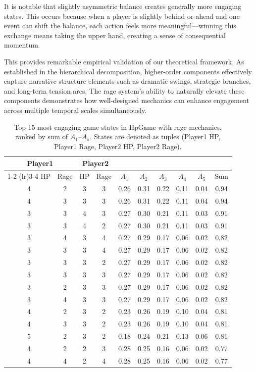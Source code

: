 \documentclass[manuscript,review,anonymous]{acmart}
\theoremstyle{definition}
\theoremstyle{plain}
\begin{document}
It is notable that slightly asymmetric balance creates generally more engaging states.
This occurs because when a player is slightly behind or ahead and one event can shift the balance, each action feels more meaningful---winning this exchange means taking the upper hand, creating a sense of consequential momentum.

This provides remarkable empirical validation of our theoretical framework.
As established in the hierarchical decomposition, higher-order components effectively capture narrative structure elements such as dramatic swings, strategic branches, and long-term tension arcs.
The rage system's ability to naturally elevate these components demonstrates how well-designed mechanics can enhance engagement across multiple temporal scales simultaneously.

\begin{table}
  \caption{Top 15 most engaging game states in HpGame with rage mechanics, ranked by sum of $A_1$--$A_5$. States are denoted as tuples (Player1 HP, Player1 Rage, Player2 HP, Player2 Rage).}
  \label{tab:most_engaging_states_rage}
  \setlength{\tabcolsep}{4pt}
  \begin{tabular}{cccccccccc}
    \toprule
    \multicolumn{2}{c}{Player1} & \multicolumn{2}{c}{Player2} & \multicolumn{6}{c}{} \\ 
    \cmidrule(lr){1-2} \cmidrule(lr){3-4}
    HP & Rage & HP & Rage & $A_1$ & $A_2$ & $A_3$ & $A_4$ & $A_5$ & Sum \\
    \midrule
    4 & 2 & 3 & 3 & 0.26 & 0.31 & 0.22 & 0.11 & 0.04 & 0.94 \\
    4 & 3 & 3 & 3 & 0.26 & 0.31 & 0.22 & 0.11 & 0.04 & 0.94 \\
    3 & 3 & 4 & 3 & 0.27 & 0.30 & 0.21 & 0.11 & 0.03 & 0.91 \\
    3 & 3 & 4 & 2 & 0.27 & 0.30 & 0.21 & 0.11 & 0.03 & 0.91 \\
    3 & 4 & 3 & 4 & 0.27 & 0.29 & 0.17 & 0.06 & 0.02 & 0.82 \\
    3 & 3 & 3 & 4 & 0.27 & 0.29 & 0.17 & 0.06 & 0.02 & 0.82 \\
    3 & 3 & 3 & 2 & 0.27 & 0.29 & 0.17 & 0.06 & 0.02 & 0.82 \\
    3 & 3 & 3 & 3 & 0.27 & 0.29 & 0.17 & 0.06 & 0.02 & 0.82 \\
    3 & 2 & 3 & 3 & 0.27 & 0.29 & 0.17 & 0.06 & 0.02 & 0.82 \\
    3 & 4 & 3 & 3 & 0.27 & 0.29 & 0.17 & 0.06 & 0.02 & 0.82 \\
    4 & 2 & 3 & 2 & 0.23 & 0.26 & 0.19 & 0.10 & 0.04 & 0.81 \\
    4 & 3 & 3 & 2 & 0.23 & 0.26 & 0.19 & 0.10 & 0.04 & 0.81 \\
    5 & 2 & 3 & 2 & 0.18 & 0.24 & 0.21 & 0.13 & 0.06 & 0.81 \\
    4 & 2 & 2 & 3 & 0.28 & 0.25 & 0.16 & 0.06 & 0.02 & 0.77 \\
    4 & 4 & 2 & 4 & 0.28 & 0.25 & 0.16 & 0.06 & 0.02 & 0.77 \\
    \bottomrule
  \end{tabular}
\end{table}
\end{document}
